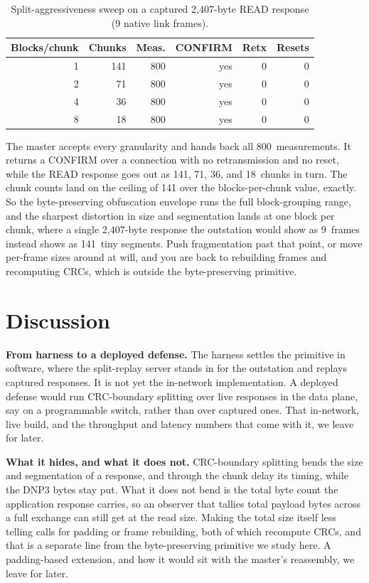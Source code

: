 \documentclass[conference]{IEEEtran}
\begin{document}
\begin{table}[t]
\centering
\caption{Split-aggressiveness sweep on a captured 2{,}407-byte READ response
(9 native link frames).}
\label{tab:sweep}
\begin{tabular}{@{}rrrrrr@{}}
\toprule
Blocks/chunk & Chunks & Meas. & CONFIRM & Retx & Resets \\
\midrule
1 & 141 & 800 & yes & 0 & 0 \\
2 & 71  & 800 & yes & 0 & 0 \\
4 & 36  & 800 & yes & 0 & 0 \\
8 & 18  & 800 & yes & 0 & 0 \\
\bottomrule
\end{tabular}
\end{table}

The master accepts every granularity and hands back all 800~measurements. It
returns a CONFIRM over a connection with no retransmission and no reset, while the
READ response goes out as 141, 71, 36, and 18~chunks in turn. The chunk counts
land on the ceiling of 141 over the blocks-per-chunk value, exactly. So the
byte-preserving obfuscation envelope runs the full block-grouping range, and the
sharpest distortion in size and segmentation lands at one block per chunk, where a
single 2{,}407-byte response the outstation would show as 9~frames instead shows
as 141~tiny segments. Push fragmentation past that point, or move per-frame sizes
around at will, and you are back to rebuilding frames and recomputing CRCs, which
is outside the byte-preserving primitive.

\section{Discussion}

\noindent\textbf{From harness to a deployed defense.} The harness settles the
primitive in software, where the split-replay server stands in for the outstation
and replays captured responses. It is not yet the in-network implementation. A
deployed defense would run CRC-boundary splitting over live responses in the data
plane, say on a programmable switch, rather than over captured ones. That
in-network, live build, and the throughput and latency numbers that come with it,
we leave for later.

\noindent\textbf{What it hides, and what it does not.} CRC-boundary splitting
bends the size and segmentation of a response, and through the chunk delay its
timing, while the DNP3 bytes stay put. What it does not bend is the total byte
count the application response carries, so an observer that tallies total payload
bytes across a full exchange can still get at the read size. Making the total size
itself less telling calls for padding or frame rebuilding, both of which recompute
CRCs, and that is a separate line from the byte-preserving primitive we study
here. A padding-based extension, and how it would sit with the master's
reassembly, we leave for later.
\end{document}
